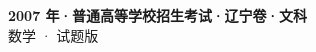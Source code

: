 \documentclass[zihao=-4, a4paper]{ctexart}
\begin{document}
\begin{center}
  {\Large\bfseries 2007 年·普通高等学校招生考试·辽宁卷·文科}\\[4pt]
  {\large 数学 · 试题版}
\end{center}
\medskip
{}

\end{document}
